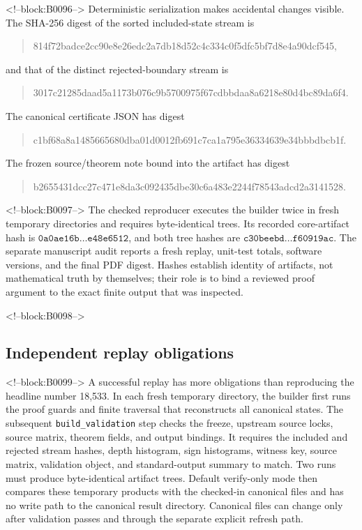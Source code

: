 \documentclass[11pt,a4paper]{article}
\theoremstyle{definition}
\begin{document}
<!--block:B0096-->
Deterministic serialization makes accidental changes visible.  The SHA-256
digest of the sorted included-state stream is
\begin{quote}\ttfamily\small
814f72badce2cc90e8e26edc2a7db18d52c4c334c0f5dfc5bf7d8e4a90dcf545,
\end{quote}
and that of the distinct rejected-boundary stream is
\begin{quote}\ttfamily\small
3017c21285daad5a1173b076c9b5700975f67cdbbdaa8a6218e80d4bc89da6f4.
\end{quote}
The canonical certificate JSON has digest
\begin{quote}\ttfamily\small
c1bf68a8a1485665680dba01d0012fb691c7ca1a795e36334639e34bbbdbcb1f.
\end{quote}
The frozen source/theorem note bound into the artifact has digest
\begin{quote}\ttfamily\small
b2655431dcc27c471e8da3c092435dbe30c6a483e2244f78543adcd2a3141528.
\end{quote}

<!--block:B0097-->
The checked reproducer executes the builder twice in fresh temporary
directories and requires byte-identical trees.  Its recorded core-artifact
hash is
\(\texttt{0a0ae16b}\ldots\texttt{e48e6512}\), and both tree hashes are
\(\texttt{c30beebd}\ldots\texttt{f60919ac}\).  The separate manuscript audit
reports a fresh replay, unit-test totals, software versions, and the final PDF
digest.  Hashes establish identity of artifacts, not mathematical truth by
themselves; their role is to bind a reviewed proof argument to the exact
finite output that was inspected.

<!--block:B0098-->
\subsection{Independent replay obligations}

<!--block:B0099-->
A successful replay has more obligations than reproducing the headline
number 18,533.  In each fresh temporary directory, the builder first runs the
proof guards and finite traversal that reconstructs all canonical states.
The subsequent \texttt{build\_validation} step checks the freeze, upstream
source locks, source matrix, theorem fields, and output bindings.  It requires
the included and rejected stream hashes, depth histogram, sign histograms,
witness key, source matrix, validation object, and standard-output summary to
match.  Two runs must produce byte-identical artifact trees.  Default
verify-only mode then compares these temporary products with the checked-in
canonical files and has no write path to the canonical result directory.
Canonical files can change only after validation passes and through the
separate explicit refresh path.
\end{document}
